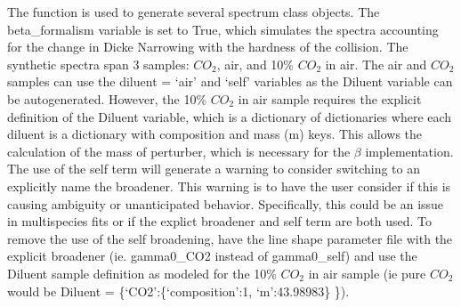 \documentclass[letterpaper,10pt,english]{sphinxmanual}
\begin{document}
\sphinxAtStartPar
The {\hyperref[\detokenize{MATS:MATS.spectrum.simulate_spectrum}]{}} function is used to generate several spectrum class objects.  The beta\_formalism variable is set to True, which simulates the spectra accounting for the change in Dicke Narrowing with the hardness of the collision.  The synthetic spectra span 3 samples: \(CO_{2}\), air, and 10\% \(CO_{2}\) in air.  The air and \(CO_{2}\) samples can use the diluent = ‘air’ and ‘self’ variables as the Diluent variable can be auto\sphinxhyphen{}generated.  However, the 10\% \(CO_{2}\) in air sample requires the explicit definition of the Diluent variable, which is a dictionary of dictionaries where each diluent is a dictionary with composition and mass (m) keys.  This allows the calculation of the mass of perturber, which is necessary for the \(\beta\) implementation.  The use of the self term will generate a warning to consider switching to an explicitly name the broadener.  This warning is to have the user consider if this is causing ambiguity or unanticipated behavior.  Specifically, this could be an issue in multi\sphinxhyphen{}species fits or if the explict broadener and self term are both used.  To remove the use of the self broadening, have the line shape parameter file with the explicit broadener (ie. gamma0\_CO2 instead of gamma0\_self) and use the Diluent sample definition as modeled for the 10\% \(CO_{2}\) in air sample (ie pure \(CO_{2}\) would be Diluent = \{‘CO2’:\{‘composition’:1, ‘m’:43.98983\} \}).
\end{document}
